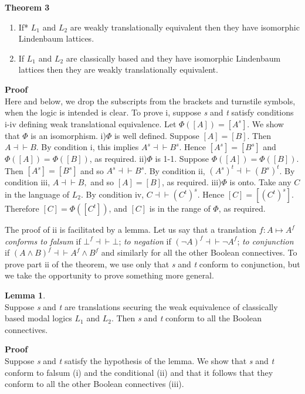 \documentclass[
  11pt,
  letterpaper,
  DIV=11,
  numbers=noendperiod,
  twoside]{scrartcl}
\providecommand{\tightlist}{%
  \setlength{\itemsep}{0pt}\setlength{\parskip}{0pt}}\usepackage{longtable,booktabs,array}
\begin{document}
\textbf{Theorem 3}

\begin{enumerate}
\def\labelenumi{\roman{enumi}.}
\tightlist
\item
  If* \(L_1\) and \(L_2\) are weakly translationally equivalent then
  they have isomorphic Lindenbaum lattices.
\item
  If \(L_1\) and \(L_2\) are classically based and they have isomorphic
  Lindenbaum lattices then they are weakly translationally equivalent.
\end{enumerate}

\textbf{Proof}\\
Here and below, we drop the subscripts from the brackets and turnstile
symbols, when the logic is intended is clear. To prove i, suppose
\emph{s} and \emph{t} satisfy conditions i-iv defining weak
translational equivalence. Let \(\Phi([A])=[A^s]\). We show that
\(\Phi\) is an isomorphism. i)\(\Phi\) is well defined. Suppose
\([A]=[B]\). Then \(A{\dashv}{\vdash}B\). By condition i, this implies
\(A^s{\dashv}{\vdash}B^s\). Hence \([A^s] = [B^s]\) and
\(\Phi([A])=\Phi([B])\), as required. ii)\(\Phi\) is 1-1. Suppose
\(\Phi([A])=\Phi([B])\). Then \([A^s]=[B^s]\) and so
\(A^s{\dashv}{\vdash}B^s\). By condition ii,
\((A^s)^t{\dashv}{\vdash}(B^s)^t\). By condition iii,
\(A{\dashv}{\vdash}B,\) and so \([A]=[B]\), as required. iii)\(\Phi\) is
onto. Take any \(C\) in the language of \(L_2\). By condition iv,
\(C{\dashv}{\vdash}(C^t)^s\). Hence \([C] = [(C^t)^s]\). Therefore
\([C]=\Phi([C^t])\), and \([C]\) is in the range of \(\Phi\), as
required.

The proof of ii is facilitated by a lemma. Let us say that a translation
\(f\colon A{\mapsto}A^f\) \emph{conforms to falsum} if
\(\bot^f {\dashv}{\vdash} \bot\); \emph{to negation} if
\((\neg A)^f {\dashv}{\vdash} \neg A^f\); \emph{to conjunction} if
\((A\wedge B)^f {\dashv}{\vdash}A^f \wedge B^f\) and similarly for all
the other Boolean connectives. To prove part ii of the theorem, we use
only that \emph{s} and \emph{t} conform to conjunction, but we take the
opportunity to prove something more general.

\textbf{Lemma 1}.\\
Suppose \emph{s} and \emph{t} are translations securing the weak
equivalence of classically based modal logics \(L_1\) and \(L_2\). Then
\emph{s} and \emph{t} conform to all the Boolean connectives.

\textbf{Proof}\\
Suppose \emph{s} and \emph{t} satisfy the hypothesis of the lemma. We
show that \emph{s} and \emph{t} conform to falsum (i) and the
conditional (ii) and that it follows that they conform to all the other
Boolean connectives (iii).
\end{document}
